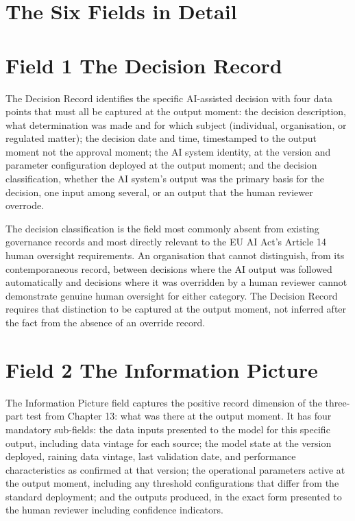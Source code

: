 \scenebreak

\section{The Six Fields in Detail}

\section{Field 1 The Decision Record}

The Decision Record identifies the specific AI-assisted decision with four data points that must all be captured at the output moment: the decision description, what determination was made and for which subject (individual, organisation, or regulated matter); the decision date and time, timestamped to the output moment not the approval moment; the AI system identity, at the version and parameter configuration deployed at the output moment; and the decision classification, whether the AI system's output was the primary basis for the decision, one input among several, or an output that the human reviewer overrode.

The decision classification is the field most commonly absent from existing governance records and most directly relevant to the EU AI Act's Article 14 human oversight requirements. An organisation that cannot distinguish, from its contemporaneous record, between decisions where the AI output was followed automatically and decisions where it was overridden by a human reviewer cannot demonstrate genuine human oversight for either category. The Decision Record requires that distinction to be captured at the output moment, not inferred after the fact from the absence of an override record.

\section{Field 2 The Information Picture}

The Information Picture field captures the positive record dimension of the three-part test from Chapter 13: what was there at the output moment. It has four mandatory sub-fields: the data inputs presented to the model for this specific output, including data vintage for each source; the model state at the version deployed, raining data vintage, last validation date, and performance characteristics as confirmed at that version; the operational parameters active at the output moment, including any threshold configurations that differ from the standard deployment; and the outputs produced, in the exact form presented to the human reviewer including confidence indicators.

